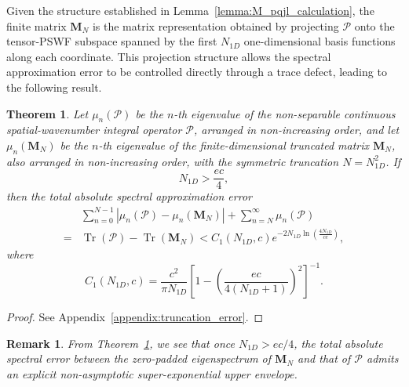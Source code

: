 \documentclass[lettersize,journal]{IEEEtran}
\theoremstyle{plain}
\newtheorem{theorem}{Theorem}
\newtheorem{remark}{Remark}
\begin{document}
Given the structure established in Lemma~\ref{lemma:M_pqjl_calculation}, the finite matrix $\mathbf{M}_N$ is the matrix representation obtained by projecting $\mathcal{P}$ onto the tensor-PSWF subspace spanned by the first $N_{1D}$ one-dimensional basis functions along each coordinate. This projection structure allows the spectral approximation error to be controlled directly through a trace defect, leading to the following result.
\begin{theorem}
	\label{theorem:approx_error}
	Let $\mu_n(\mathcal{P})$ be the $n$-th eigenvalue of the
	non-separable continuous spatial-wavenumber integral operator
	$\mathcal{P}$, arranged in non-increasing order, and let
	$\mu_n(\mathbf{M}_N)$ be the $n$-th eigenvalue of the
	finite-dimensional truncated matrix $\mathbf{M}_N$, also arranged
	in non-increasing order, with the symmetric truncation
	$N=N_{1D}^2$. If
	$$
		N_{1D}>\frac{ec}{4},
	$$
	then the total absolute spectral approximation error
	\begin{align}
		&\sum_{n=0}^{N-1}
		\left|
		\mu_n(\mathcal{P})-\mu_n(\mathbf{M}_N)
		\right|
		+
		\sum_{n=N}^{\infty}\mu_n(\mathcal{P})
		\nonumber\\
		= & 
		\operatorname{Tr}(\mathcal{P})
		-
		\operatorname{Tr}(\mathbf{M}_N) <
		C_1(N_{1D},c)
		e^{-2N_{1D}
			\ln\left(\frac{4N_{1D}}{ce}\right)}, \nonumber
		\label{eq:error_truncation}
	\end{align}
	where
	\begin{equation}
		C_1(N_{1D},c)
		=
		\frac{c^2}{\pi N_{1D}}
		\left[
		1-
		\left(
		\frac{ec}{4(N_{1D}+1)}
		\right)^2
		\right]^{-1}.
		\label{eq:C1_definition}
	\end{equation}
\end{theorem}
\begin{proof}
	See Appendix~\ref{appendix:truncation_error}.
\end{proof}
\begin{remark}
	From Theorem~\ref{theorem:approx_error}, we see that once $N_{1D}>ec/4$, the total absolute spectral error between the zero-padded
	eigenspectrum of $\mathbf{M}_N$ and that of $\mathcal{P}$ admits an explicit non-asymptotic
	super-exponential upper envelope. 
\end{remark}
\end{document}
